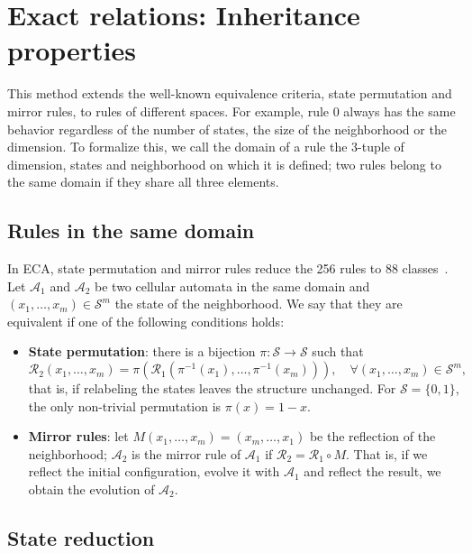 \section{Exact relations: Inheritance properties}
\label{sec:inheritance}

This method extends the well-known equivalence criteria, state permutation and mirror rules, to rules of different spaces. For example, rule 0 always has the same behavior regardless of the number of states, the size of the neighborhood or the dimension. To formalize this, we call the domain of a rule the 3-tuple of dimension, states and neighborhood on which it is defined; two rules belong to the same domain if they share all three elements.

\subsection{Rules in the same domain}
\label{subsection:rules_same_domain}

In ECA, state permutation and mirror rules reduce the 256 rules to 88 classes~\cite{genaro2013_class}. Let $\mathcal{A}_1$ and $\mathcal{A}_2$ be two cellular automata in the same domain and $(x_1, \dots, x_m) \in \mathcal{S}^m$ the state of the neighborhood. We say that they are equivalent if one of the following conditions holds:
\begin{itemize}
    \item \textbf{State permutation}: there is a bijection $\pi : \mathcal{S} \to \mathcal{S}$ such that
    \[
    \mathcal{R}_2(x_1, \dots, x_m) = \pi\left( \mathcal{R}_1\left( \pi^{-1}(x_1), \dots, \pi^{-1}(x_m) \right) \right), \quad \forall (x_1, \dots, x_m) \in \mathcal{S}^m,
    \]
    that is, if relabeling the states leaves the structure unchanged. For $\mathcal{S} = \{0, 1\}$, the only non-trivial permutation is $\pi(x) = 1 - x$.

    \item \textbf{Mirror rules}: let $M(x_1, \dots, x_m) = (x_m, \dots, x_1)$ be the reflection of the neighborhood; $\mathcal{A}_2$ is the mirror rule of $\mathcal{A}_1$ if $\mathcal{R}_2 = \mathcal{R}_1 \circ M$. That is, if we reflect the initial configuration, evolve it with $\mathcal{A}_1$ and reflect the result, we obtain the evolution of $\mathcal{A}_2$.
\end{itemize}

\subsection{State reduction}


